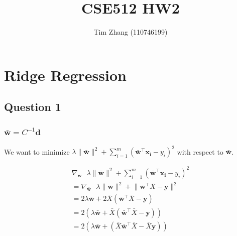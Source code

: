 \documentclass[11pt, oneside]{article}   	%
\title{CSE512 HW2}
\author{Tim Zhang (110746199)}
\date{}							%
\begin{document}
\maketitle

\DeclarePairedDelimiter{\norm}{\lVert}{\rVert}

\section{Ridge Regression}
\subsection{Question 1}
\subsubsection{$\boldsymbol{\bar{w}} = C^{-1}\boldsymbol{d}$}
We want to minimize $\lambda \lVert \boldsymbol{\bar{w}} \rVert^2 + \sum_{i = 1}^m(\boldsymbol{\bar{w}}^{\top} \boldsymbol{x_i} - y_i)^2$ with respect to $\boldsymbol{\bar{w}}$.

\begin{gather*}
\nabla_{\boldsymbol{\bar{w}}} \text{ } \lambda \lVert \boldsymbol{\bar{w}} \rVert^2 + \sum_{i = 1}^m(\boldsymbol{\bar{w}}^\top \boldsymbol{x_i} - y_i)^2\\
= \nabla_{\boldsymbol{\bar{w}}} \text{ } \lambda \lVert \boldsymbol{\bar{w}} \rVert^2 + \lVert \boldsymbol{\bar{w}}^\top \bar{X} - \boldsymbol{y} \rVert^2\\
= 2\lambda \boldsymbol{\bar{w}} + 2\bar{X} (\boldsymbol{\bar{w}}^\top \bar{X} - \boldsymbol{y})\\
= 2(\lambda \boldsymbol{\bar{w}} + \bar{X} (\boldsymbol{\bar{w}}^\top \bar{X} - \boldsymbol{y}))\\
= 2(\lambda \boldsymbol{\bar{w}} + (\bar{X}\boldsymbol{\bar{w}}^\top \bar{X} - \bar{X} \boldsymbol{y}))
\end{gather*}
\end{document}
